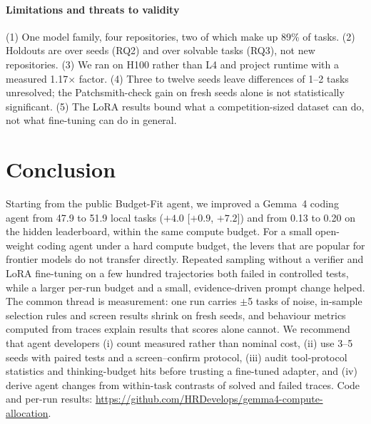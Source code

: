 \documentclass[conference]{IEEEtran}
\begin{document}
\paragraph*{Limitations and threats to validity} (1) One model family, four repositories, two of which make up 89\% of tasks. (2) Holdouts are over seeds (RQ2) and over solvable tasks (RQ3), not new repositories. (3) We ran on H100 rather than L4 and project runtime with a measured 1.17$\times$ factor. (4) Three to twelve seeds leave differences of 1--2 tasks unresolved; the Patchsmith-check gain on fresh seeds alone is not statistically significant. (5) The LoRA results bound what a competition-sized dataset can do, not what fine-tuning can do in general.

\section{Conclusion}
Starting from the public Budget-Fit agent, we improved a Gemma~4 coding agent from 47.9 to 51.9 local tasks ($+4.0$ [$+0.9$, $+7.2$]) and from 0.13 to 0.20 on the hidden leaderboard, within the same compute budget. For a small open-weight coding agent under a hard compute budget, the levers that are popular for frontier models do not transfer directly. Repeated sampling without a verifier and LoRA fine-tuning on a few hundred trajectories both failed in controlled tests, while a larger per-run budget and a small, evidence-driven prompt change helped. The common thread is measurement: one run carries $\pm$5 tasks of noise, in-sample selection rules and screen results shrink on fresh seeds, and behaviour metrics computed from traces explain results that scores alone cannot. We recommend that agent developers (i) count measured rather than nominal cost, (ii) use 3--5 seeds with paired tests and a screen--confirm protocol, (iii) audit tool-protocol statistics and thinking-budget hits before trusting a fine-tuned adapter, and (iv) derive agent changes from within-task contrasts of solved and failed traces. Code and per-run results: \url{https://github.com/HRDevelops/gemma4-compute-allocation}.



\end{document}
